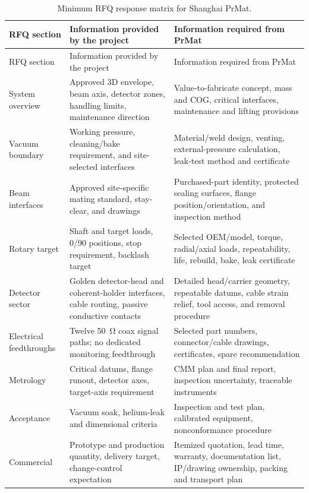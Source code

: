 \documentclass[10pt,letterpaper]{article}
\begin{document}
\begin{longtable}{L{0.19\textwidth}L{0.34\textwidth}L{0.38\textwidth}}
  \caption{Minimum RFQ response matrix for Shanghai PrMat.}\\
  \toprule
  RFQ section & Information provided by the project & Information required from PrMat \\
  \midrule
  \endfirsthead
  \toprule
  RFQ section & Information provided by the project & Information required from PrMat \\
  \midrule
  \endhead
  System overview & Approved 3D envelope, beam axis, detector zones, handling limits,
    maintenance direction & Value-to-fabricate concept, mass and COG, critical interfaces,
    maintenance and lifting provisions \\
  Vacuum boundary & Working pressure, cleaning/bake requirement, and site-selected interfaces &
    Material/weld design, venting, external-pressure calculation, leak-test method and certificate \\
  Beam interfaces & Approved site-specific mating standard, stay-clear, and drawings &
    Purchased-part identity, protected sealing surfaces, flange position/orientation, and
    inspection method \\
  Rotary target & Shaft and target loads, 0/90 positions, stop requirement, backlash target &
    Selected OEM/model, torque, radial/axial loads, repeatability, life, rebuild, bake, leak certificate \\
  Detector sector & Golden detector-head and coherent-holder interfaces, cable routing,
    passive conductive contacts & Detailed head/carrier geometry, repeatable datums, cable
    strain relief, tool access, and removal procedure \\
  Electrical feedthroughs & Twelve \SI{50}{\ohm} coax signal paths; no dedicated
    monitoring feedthrough &
    Selected part numbers, connector/cable drawings, certificates, spare recommendation \\
  Metrology & Critical datums, flange runout, detector axes, target-axis requirement &
    CMM plan and final report, inspection uncertainty, traceable instruments \\
  Acceptance & Vacuum soak, helium-leak and dimensional criteria &
    Inspection and test plan, calibrated equipment, nonconformance procedure \\
  Commercial & Prototype and production quantity, delivery target, change-control expectation &
    Itemized quotation, lead time, warranty, documentation list, IP/drawing ownership,
    packing and transport plan \\
  \bottomrule
\end{longtable}
\end{document}
